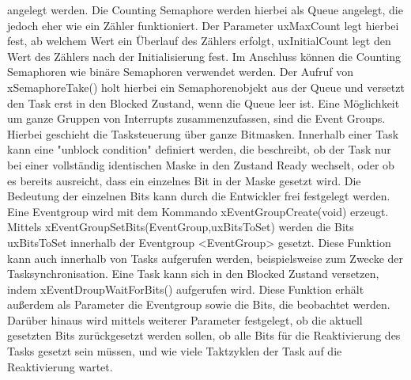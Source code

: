 angelegt werden. Die Counting Semaphore werden hierbei als Queue angelegt, die jedoch eher wie ein Zähler funktioniert. Der Parameter uxMaxCount legt hierbei fest, ab welchem Wert ein Überlauf des Zählers erfolgt, uxInitialCount legt den Wert des Zählers nach der Initialisierung fest. Im Anschluss können die Counting Semaphoren wie binäre Semaphoren verwendet werden. Der Aufruf von xSemaphoreTake() holt hierbei ein Semaphorenobjekt aus der Queue und versetzt den Task erst in den Blocked Zustand, wenn die Queue leer ist.
Eine Möglichkeit um ganze Gruppen von Interrupts zusammenzufassen, sind die Event Groups. Hierbei geschieht die Tasksteuerung über ganze Bitmasken. Innerhalb einer Task kann eine "unblock condition" definiert werden, die beschreibt, ob der Task nur bei einer vollständig identischen Maske in den Zustand Ready wechselt, oder ob es bereits ausreicht, dass ein einzelnes Bit in der Maske gesetzt wird. Die Bedeutung der einzelnen Bits kann durch die Entwickler frei festgelegt werden. Eine Eventgroup wird mit dem Kommando xEventGroupCreate(void) erzeugt. Mittels xEventGroupSetBits(EventGroup,uxBitsToSet) werden die Bits uxBitsToSet innerhalb der Eventgroup <EventGroup> gesetzt. Diese Funktion kann auch innerhalb von Tasks aufgerufen werden, beispielsweise zum Zwecke der Tasksynchronisation. Eine Task kann sich in den Blocked Zustand versetzen, indem xEventDroupWaitForBits() aufgerufen wird. Diese Funktion erhält außerdem als Parameter die Eventgroup sowie die Bits, die beobachtet werden. Darüber hinaus wird mittels weiterer Parameter festgelegt, ob die aktuell gesetzten Bits zurückgesetzt werden sollen, ob alle Bits für die Reaktivierung des Tasks gesetzt sein müssen, und wie viele Taktzyklen der Task auf die Reaktivierung wartet.
